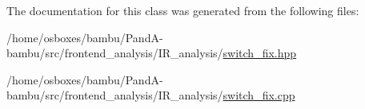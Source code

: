 The documentation for this class was generated from the following files\+:\begin{DoxyCompactItemize}
\item 
/home/osboxes/bambu/\+Pand\+A-\/bambu/src/frontend\+\_\+analysis/\+I\+R\+\_\+analysis/\hyperlink{switch__fix_8hpp}{switch\+\_\+fix.\+hpp}\item 
/home/osboxes/bambu/\+Pand\+A-\/bambu/src/frontend\+\_\+analysis/\+I\+R\+\_\+analysis/\hyperlink{switch__fix_8cpp}{switch\+\_\+fix.\+cpp}\end{DoxyCompactItemize}
